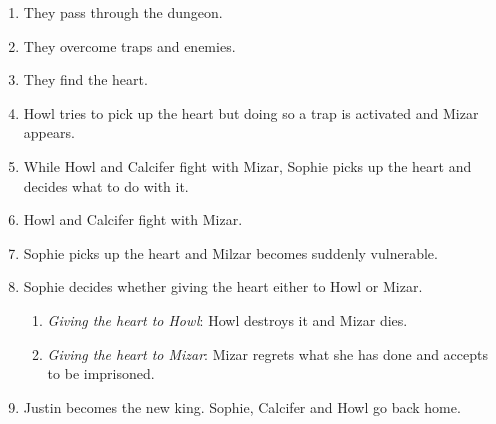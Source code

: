 \begin{enumerate}
\begin{enumerate}
  \item They pass through the dungeon.
    
  \item They overcome traps and enemies.
    
  \item They find the heart.
    
  \item Howl tries to pick up the heart but doing so a trap is activated and Mizar appears.
    
  \item While Howl and Calcifer fight with Mizar, Sophie picks up the heart and decides what to do with it.
    
  \item Howl and Calcifer fight with Mizar.
    
  \item Sophie picks up the heart and Milzar becomes suddenly vulnerable.
    
  \item Sophie decides whether giving the heart  either to Howl or Mizar.
    
    \begin{enumerate}
    \item \textit{Giving the heart to Howl}: Howl destroys it and Mizar dies.
      
    \item \textit{Giving the heart to Mizar}: Mizar regrets what she has done and accepts to be imprisoned.
    \end{enumerate}
    
  \item Justin becomes the new king. Sophie, Calcifer and Howl go back home.
  \end{enumerate}

\end{enumerate}
